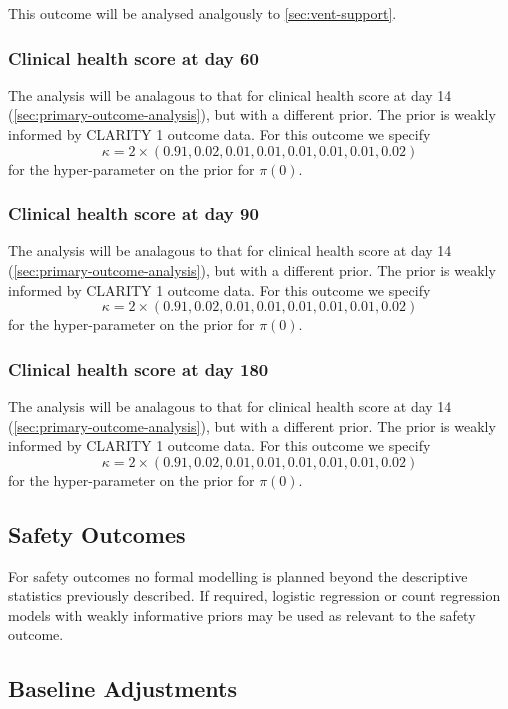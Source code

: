 \documentclass[11pt,parskip=half-]{scrartcl}
\begin{document}
This outcome will be analysed analgously to \ref{sec:vent-support}.

\subsubsection{Clinical health score at day 60}
The analysis will be analagous to that for clinical health score at day 14 (\ref{sec:primary-outcome-analysis}), but with a different prior. The prior is weakly informed by CLARITY 1 outcome data. For this outcome we specify
$$
    \kappa = 2\times(0.91, 0.02, 0.01, 0.01, 0.01, 0.01, 0.01, 0.02)
$$
for the hyper-parameter on the prior for $\pi(0)$.

\subsubsection{Clinical health score at day 90}
The analysis will be analagous to that for clinical health score at day 14 (\ref{sec:primary-outcome-analysis}), but with a different prior. The prior is weakly informed by CLARITY 1 outcome data. For this outcome we specify
$$
    \kappa  = 2\times(0.91, 0.02, 0.01, 0.01, 0.01, 0.01, 0.01, 0.02)
$$
for the hyper-parameter on the prior for $\pi(0)$.

\subsubsection{Clinical health score at day 180}
The analysis will be analagous to that for clinical health score at day 14 (\ref{sec:primary-outcome-analysis}), but with a different prior. The prior is weakly informed by CLARITY 1 outcome data. For this outcome we specify
$$
    \kappa = 2\times(0.91, 0.02, 0.01, 0.01, 0.01, 0.01, 0.01, 0.02)
$$
for the hyper-parameter on the prior for $\pi(0)$.

\subsection{Safety Outcomes}

For safety outcomes no formal modelling is planned beyond the descriptive statistics previously described. If required, logistic regression or count regression models with weakly informative priors may be used as relevant to the safety outcome.

\subsection{Baseline Adjustments}
\end{document}
